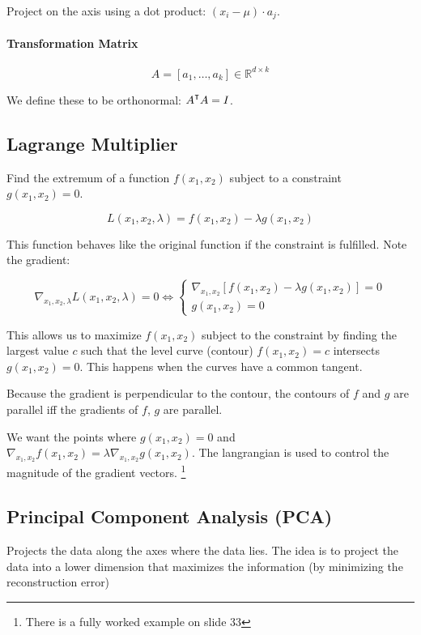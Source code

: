 \documentclass{idc_msc}
\renewcommand{\T}{{\mathpalette\raiseT\intercal}} %
\begin{document}
Project on the axis using a dot product: \((x_i - \mu) \cdot a_j\).

\paragraph{Transformation Matrix}

\[A = [a_1,\ldots,a_k] \in \mathbb{R}^{d \times k}\]

We define these to be orthonormal: \(A^\T A = I\).

\subsection{Lagrange Multiplier}

Find the extremum of a function \(f(x_1, x_2)\) subject to a constraint \(g(x_1, x_2) = 0\).

\[L(x_1, x_2, \lambda) = f(x_1, x_2) - \lambda g(x_1, x_2)\]

This function behaves like the original function if the constraint is fulfilled. Note the gradient:

\[
\nabla_{x_1, x_2, \lambda} L(x_1, x_2, \lambda) = 0 \Leftrightarrow
\begin{cases}
\nabla_{x_1, x_2} [f(x_1, x_2) - \lambda g(x_1, x_2)] = 0 \\
g(x_1, x_2) = 0
\end{cases}
\]

This allows us to maximize \(f(x_1, x_2)\) subject to the constraint by finding the largest value \(c\) such that the level curve (contour) \(f(x_1, x_2) = c\) intersects \(g(x_1,x_2) = 0\).
This happens when the curves have a common tangent.

Because the gradient is perpendicular to the contour, the contours of \(f\) and \(g\) are parallel iff the gradients of \(f\), \(g\) are parallel.

We want the points where \(g(x_1, x_2) = 0\) and \(\nabla_{x_1, x_2} f(x_1, x_2) = \lambda \nabla_{x_1, x_2}g(x_1, x_2)\).
The langrangian is used to control the magnitude of the gradient vectors.
\footnote{There is a fully worked example on slide 33}

\subsection{Principal Component Analysis (PCA)}

Projects the data along the axes where the data lies.
The idea is to project the data into a lower dimension that maximizes the information (by minimizing the reconstruction error)
\end{document}
